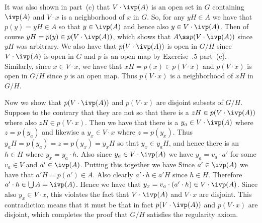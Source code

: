 {{    It was also shown in part~(c) that $V \cdot \ivp(A)$ is an open set in $G$ containing $\ivp(A)$ and $V \cdot x$ is a neighborhood of $x$ in $G$.
    So, for any $yH \in A$ we have that $p(y) = yH \in A$ so that $y \in \ivp(A)$ and hence also $y \in V \cdot \ivp(A)$.
    Then of course $yH = p(y) \in p(V \cdot \ivp(A))$, which shows that $A \ss p(V \cdot \ivp(A))$ since $yH$ was arbitrary.
    We also have that $p(V \cdot \ivp(A))$ is open in $G/H$ since $V \cdot \ivp(A)$ is open in $G$ and $p$ is an open map by Exercise~\secl.5 part~(c).
    Similarly, since $x \in V \cdot x$, we have that $xH = p(x) \in p(V \cdot x)$ and $p(V \cdot x)$ is open in $G/H$ since $p$ is an open map.
    Thus $p(V \cdot x)$ is a neighborhood of $xH$ in $G/H$.

    Now we show that $p(V \cdot \ivp(A))$ and $p(V \cdot x)$ are disjoint subsets of $G/H$.
    Suppose to the contrary that they are not so that there is a $zH \in p(V \cdot \ivp(A))$ where also $zH \in p(V \cdot x)$.
    Then we have that there is a $y_a \in V \cdot \ivp(A)$ where $z = p(y_a)$ and likewise a $y_x \in V \cdot x$ where $z = p(y_x)$.
    Thus $y_a H = p(y_a) = z = p(y_x) = y_x H$ so that $y_x \in y_a H$, and hence there is an $h \in H$ where $y_x = y_a \cdot h$.
    Also since $y_a \in V \cdot \ivp(A)$ we have $y_a = v_a \cdot a'$ for some $v_a \in V$ and $a' \in \ivp(A)$.
    Putting this together we have
    Since $a' \in \ivp(A)$ we have that $a'H = p(a') \in A$.
    Also clearly $a' \cdot h \in a'H$ since $h \in H$.
    Therefore $a' \cdot h \in \bigcup A = \ivp(A)$.
    Hence we have that $y_x = v_a \cdot (a' \cdot h) \in V \cdot \ivp(A)$.
    Since also $y_x \in V \cdot x$, this violates the fact that $V \cdot \ivp(A)$ and $V \cdot x$ are disjoint.
    This contradiction means that it must be that in fact $p(V \cdot \ivp(A))$ and $p(V \cdot x)$ are disjoint, which completes the proof that $G/H$ satisfies the regularity axiom.
  }
}

\renewcommand\thesubsection{\arabic{subsection}}
